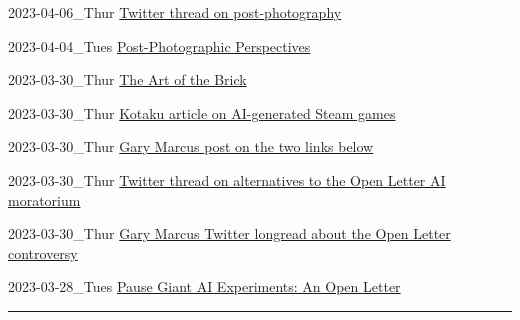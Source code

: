 \documentclass[
  letterpaper,
  DIV=11,
  numbers=noendperiod]{scrartcl}
\begin{document}
2023-04-06\_Thur
\href{https://twitter.com/Historic_Crypto/status/1641106531147030530}{Twitter
thread on post-photography}

2023-04-04\_Tues \href{https://postphotography.xyz/}{Post-Photographic
Perspectives}

2023-03-30\_Thur \href{https://artofthebrickexhibit.com/}{The Art of the
Brick}

2023-03-30\_Thur
\href{https://kotaku.com/steam-pc-ai-generated-art-midjourney-youtube-valve-1849531585}{Kotaku
article on AI-generated Steam games}

2023-03-30\_Thur
\href{https://garymarcus.substack.com/p/the-open-letter-controversy}{Gary
Marcus post on the two links below}

2023-03-30\_Thur
\href{https://twitter.com/garymarcus/status/1641137676618457088?s=46\&t=0Inx0sRD_78X35N9VmpoqA}{Twitter
thread on alternatives to the Open Letter AI moratorium}

2023-03-30\_Thur
\href{https://twitter.com/GaryMarcus/status/1641420433391259648}{Gary
Marcus Twitter longread about the Open Letter controversy}

2023-03-28\_Tues
\href{https://futureoflife.org/open-letter/pause-giant-ai-experiments/}{Pause
Giant AI Experiments: An Open Letter}

\begin{center}\rule{0.5\linewidth}{0.5pt}\end{center}
\end{document}
